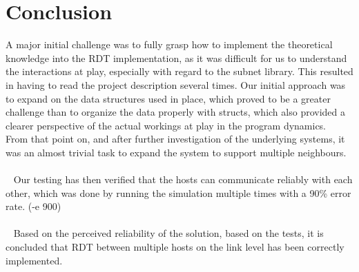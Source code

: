 \section{Conclusion}
A major initial challenge was to fully grasp how to implement the theoretical knowledge into the RDT implementation, as it was difficult for us to understand the interactions at play, especially with regard to the subnet library. This resulted in having to read the project description several times.
Our initial approach was to expand on the data structures used in place, which proved to be a greater challenge than to organize the data properly with structs, which also provided a clearer perspective of the actual workings at play in the program dynamics.\\
From that point on, and after further investigation of the underlying systems, it was an almost trivial task to expand the system to support multiple neighbours.\\
\\~
Our testing has then verified that the hosts can communicate reliably with each other, which was done by running the simulation multiple times with a 90\% error rate. (-e 900)\\
\\~
Based on the perceived reliability of the solution, based on the tests, it is concluded that RDT between multiple hosts on the link level has been correctly implemented.
